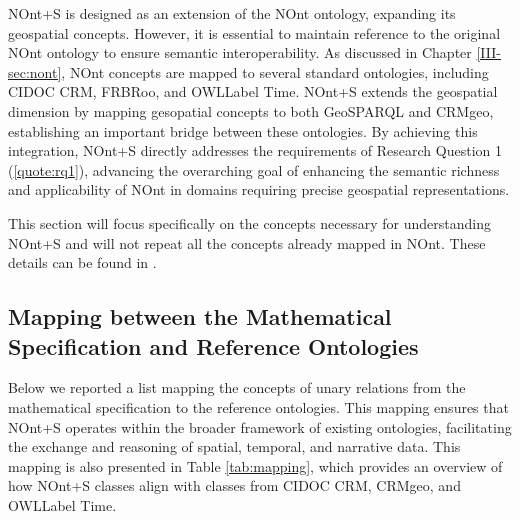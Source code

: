 NOnt+S is designed as an extension of the NOnt ontology, expanding its geospatial concepts. However, it is essential to maintain reference to the original NOnt ontology to ensure semantic interoperability. As discussed in Chapter \ref{III-sec:nont}, NOnt concepts are mapped to several standard ontologies, including CIDOC CRM, FRBRoo, and \acrshort{OWLLabel} Time. NOnt+S extends the geospatial dimension by mapping gesopatial concepts to both GeoSPARQL and CRMgeo, establishing an important bridge between these ontologies. By achieving this integration, NOnt+S directly addresses the requirements of Research Question 1 (\ref{quote:rq1}), advancing the overarching goal of enhancing the semantic richness and applicability of NOnt in domains requiring precise geospatial representations.

This section will focus specifically on the concepts necessary for understanding NOnt+S and will not repeat all the concepts already mapped in NOnt. These details can be found in \cite{meghiniRepresentingNarrativesDigital2021}. 

\subsection{Mapping between the Mathematical Specification and Reference Ontologies}\label{V-subsec:mappingMathematicalReference}

Below we reported a list mapping the concepts of unary relations from the mathematical specification to the reference ontologies. This mapping ensures that NOnt+S operates within the broader framework of existing ontologies, facilitating the exchange and reasoning of spatial, temporal, and narrative data. This mapping is also presented in Table \ref{tab:mapping}, which provides an overview of how NOnt+S classes align with classes from CIDOC CRM, CRMgeo, and \acrshort{OWLLabel} Time.

